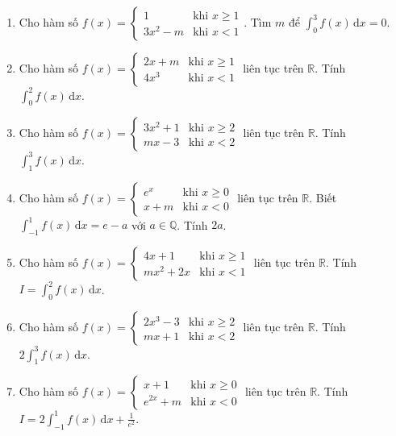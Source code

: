 \documentclass[12pt]{article}
\begin{document}
\begin{enumerate}[label=\textbf{Câu \arabic*.}]
		\item Cho hàm số $f(x) = \begin{cases} 1 & \text{khi } x \ge 1 \\ 3x^2 - m & \text{khi } x < 1 \end{cases}$. Tìm $m$ để $\displaystyle \int_0^3 f(x)\,\mathrm{d}x = 0$.
		\vspace{0.75cm}
		
		\item Cho hàm số $f(x) = \begin{cases} 2x + m & \text{khi } x \ge 1 \\ 4x^3 & \text{khi } x < 1 \end{cases}$ liên tục trên $\mathbb{R}$. Tính $\displaystyle \int_0^2 f(x)\,\mathrm{d}x$.
		\vspace{0.75cm}
		
		\item Cho hàm số $f(x) = \begin{cases} 3x^2 + 1 & \text{khi } x \ge 2 \\ mx - 3 & \text{khi } x < 2 \end{cases}$ liên tục trên $\mathbb{R}$. Tính $\displaystyle \int_1^3 f(x)\,\mathrm{d}x$.
		\vspace{0.75cm}
		
		\item Cho hàm số $f(x) = \begin{cases} e^x & \text{khi } x \ge 0 \\ x + m & \text{khi } x < 0 \end{cases}$ liên tục trên $\mathbb{R}$. Biết $\displaystyle \int_{-1}^1 f(x)\,\mathrm{d}x = e - a$ với $a \in \mathbb{Q}$. Tính $2a$.
		\vspace{0.75cm}
		
		\item Cho hàm số $f(x) = \begin{cases} 4x + 1 & \text{khi } x \ge 1 \\ mx^2 + 2x & \text{khi } x < 1 \end{cases}$ liên tục trên $\mathbb{R}$. Tính $I = \displaystyle \int_0^2 f(x)\,\mathrm{d}x$.
		\vspace{0.75cm}
		
		\item Cho hàm số $f(x) = \begin{cases} 2x^3 - 3 & \text{khi } x \ge 2 \\ mx + 1 & \text{khi } x < 2 \end{cases}$ liên tục trên $\mathbb{R}$. Tính $2 \displaystyle \int_1^3 f(x)\,\mathrm{d}x$.
		\vspace{0.75cm}
		
		\item Cho hàm số $f(x) = \begin{cases} x + 1 & \text{khi } x \ge 0 \\ e^{2x} + m & \text{khi } x < 0 \end{cases}$ liên tục trên $\mathbb{R}$. Tính $I = 2\displaystyle \int_{-1}^1 f(x)\,\mathrm{d}x + \frac{1}{e^2}$.
		\vspace{0.75cm}
\end{enumerate}
	
\end{document}
